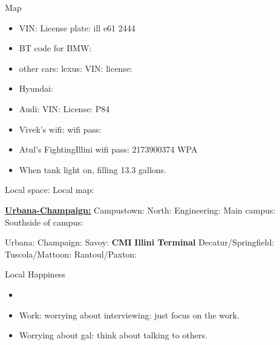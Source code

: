 \documentclass[serif, mathserif, final]{beamer}
\begin{document}
\begin{frame}
\begin{columns}
\begin{column}{0.25\linewidth}
\begin{block}{Map}
 
        \begin{itemize}
        \tiny \item \tiny VIN:  License plate: ill e61 2444  
          \item \tiny BT code for BMW:
        \end{itemize} 

        \begin{itemize} 
          \tiny \item \tiny other cars: lexus:  VIN:  license:
        \item \tiny  Hyundai: 
        \item \tiny  Audi: VIN:  License: P84  
        \end{itemize} 

        \begin{itemize} 
        \tiny \item \tiny Vivek's wifi:   wifi pass: 
        \item \tiny Atul’s FightingIllini  wifi pass:  2173900374 WPA  \\
        \item \tiny When tank light on, filling 13.3 gallons. 
        \end{itemize} 

        Local space: 
        Local map: 

        \textbf{\underline{Urbana-Champaign:}} 
        Campustown: 
        North: Engineering: 
        Main campus: 
        Southside of campus: 
        
        Urbana: 
        Champaign: 
        Savoy: 
        \textbf{CMI} 
        \textbf{Illini Terminal} 
        Decatur/Springfield: 
        Tuscola/Mattoon: 
        Rantoul/Paxton: 

\end{block}

      \begin{block}{Local Happiness}
        \begin{itemize}
          \item \tiny 
          \tiny \item \tiny Work: worrying about interviewing: just focus on the work. 
        \item \tiny Worrying about gal: think about talking to others. 
        \end{itemize}
      \end{block}
      

\end{column}
\end{columns}
\end{frame}
\end{document}

